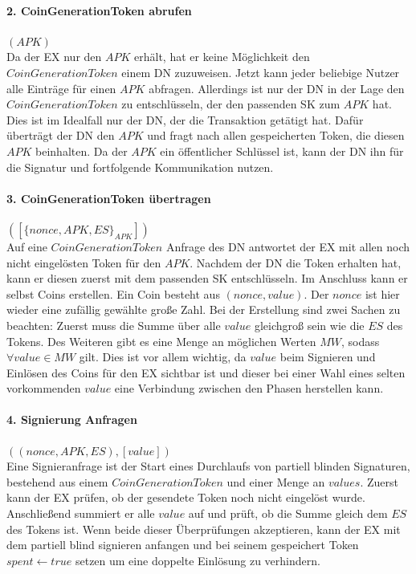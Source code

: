 \documentclass[
	fontsize=11pt,
	headings=small,
	parskip=half,           %
	bibliography=totoc,
	numbers=noenddot,       %
	open=any,               %
]{scrreprt}
\begin{document}
\paragraph{2. CoinGenerationToken abrufen} $(APK)$\\
Da der EX nur den $APK$ erhält, hat er keine Möglichkeit den $CoinGenerationToken$ einem DN zuzuweisen. Jetzt kann jeder beliebige Nutzer alle Einträge für einen $APK$ abfragen. Allerdings ist nur der DN in der Lage den $CoinGenerationToken$ zu entschlüsseln, der den passenden SK zum $APK$ hat. Dies ist im Idealfall nur der DN, der die Transaktion getätigt hat. Dafür überträgt der DN den $APK$ und fragt nach allen gespeicherten Token, die diesen $APK$ beinhalten. Da der $APK$ ein öffentlicher Schlüssel ist, kann der DN ihn für die Signatur und fortfolgende Kommunikation nutzen.

\paragraph{3. CoinGenerationToken übertragen} $([\{nonce, APK, ES\}_{APK}])$\\
Auf eine $CoinGenerationToken$ Anfrage des DN antwortet der EX mit allen noch nicht eingelösten Token für den $APK$. Nachdem der DN die Token erhalten hat, kann er diesen zuerst mit dem passenden SK entschlüsseln. Im Anschluss kann er selbst Coins erstellen. Ein Coin besteht aus $(nonce, value)$. Der $nonce$ ist hier wieder eine zufällig gewählte große Zahl. Bei der Erstellung sind zwei Sachen zu beachten: Zuerst muss die Summe über alle $value$ gleichgroß sein wie die $ES$ des Tokens. Des Weiteren gibt es eine Menge an möglichen Werten $MW$, sodass $\forall value\in MW$ gilt. Dies ist vor allem wichtig, da $value$ beim Signieren und Einlösen des Coins für den EX sichtbar ist und dieser bei einer Wahl eines selten vorkommenden $value$ eine Verbindung zwischen den Phasen herstellen kann.

\paragraph{4. Signierung Anfragen} $((nonce, APK, ES), [value])$\\
Eine Signieranfrage ist der Start eines Durchlaufs von partiell blinden Signaturen, bestehend aus einem $CoinGenerationToken$ und einer Menge an $values$. Zuerst kann der EX prüfen, ob der gesendete Token noch nicht eingelöst wurde. Anschließend summiert er alle $value$ auf und prüft, ob die Summe gleich dem $ES$ des Tokens ist. Wenn beide dieser Überprüfungen akzeptieren, kann der EX mit dem partiell blind signieren anfangen und bei seinem gespeichert Token $spent \leftarrow true$ setzen um eine doppelte Einlösung zu verhindern.
\end{document}
